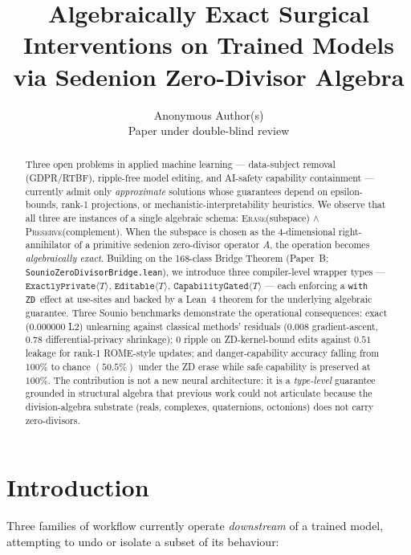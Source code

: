 \documentclass{article}
\title{Algebraically Exact Surgical Interventions on Trained Models\\via Sedenion Zero-Divisor Algebra}
\author{%
  Anonymous Author(s)\\
  Paper under double-blind review%
}
\newcommand{\ExactlyPrivate}[1]{\texttt{ExactlyPrivate}\langle #1 \rangle}
\newcommand{\Editable}[1]{\texttt{Editable}\langle #1 \rangle}
\newcommand{\CapabilityGated}[1]{\texttt{CapabilityGated}\langle #1 \rangle}
\newcommand{\withZD}{\texttt{with ZD}}
\begin{document}
\maketitle

\begin{abstract}
Three open problems in applied machine learning --- data-subject removal
(GDPR/RTBF), ripple-free model editing, and AI-safety capability containment
--- currently admit only \emph{approximate} solutions whose guarantees depend
on epsilon-bounds, rank-1 projections, or mechanistic-interpretability
heuristics.  We observe that all three are instances of a single algebraic
schema: \textsc{Erase}(subspace) $\land$ \textsc{Preserve}(complement).  When
the subspace is chosen as the 4-dimensional right-annihilator of a primitive
sedenion zero-divisor operator $A$, the operation becomes
\emph{algebraically exact}.  Building on the 168-class Bridge Theorem (Paper~B;
\texttt{SounioZeroDivisorBridge.lean}), we introduce three compiler-level
wrapper types --- $\ExactlyPrivate{T}$, $\Editable{T}$, $\CapabilityGated{T}$
--- each enforcing a \withZD~effect at use-sites and backed by a Lean~4
theorem for the underlying algebraic guarantee.  Three Sounio benchmarks
demonstrate the operational consequences: exact ($0.000000$ L2) unlearning
against classical methods' residuals ($0.008$ gradient-ascent, $0.78$
differential-privacy shrinkage); $0$ ripple on ZD-kernel-bound edits against
$0.51$ leakage for rank-1 ROME-style updates; and danger-capability accuracy
falling from $100\%$ to chance $(50.5\%)$ under the ZD erase while safe
capability is preserved at $100\%$.  The contribution is not a new neural
architecture: it is a \emph{type-level} guarantee grounded in structural
algebra that previous work could not articulate because the division-algebra
substrate (reals, complexes, quaternions, octonions) does not carry
zero-divisors.
\end{abstract}

\section{Introduction}

Three families of workflow currently operate \emph{downstream} of a trained
model, attempting to undo or isolate a subset of its behaviour:
\end{document}

